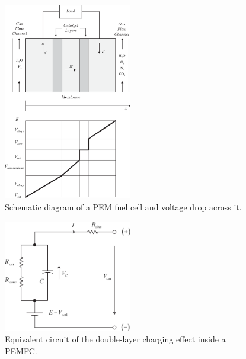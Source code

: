 \documentclass[11pt,a4paper]{article}
\numberwithin{equation}{section}
\theoremstyle{it}
\theoremstyle{definition}
\begin{document}
\begin{figure}[H]
	\centering
	\includegraphics[width = 0.5\textwidth, width = 250pt, angle = 0, keepaspectratio]{figures/pem_fuel_cell/pem_fuel_cell_1.eps}
	\captionsetup{width=0.5\textwidth}		
	\caption{Schematic diagram of a PEM fuel cell and voltage drop across it.}
	\label{pem_fc_intro_1}
\end{figure}

\begin{figure}[H]
	\centering
	\includegraphics[width = 0.5\textwidth, width = 250pt, angle = 0, keepaspectratio]{figures/pem_fuel_cell/pemfc_eq_circuit_1.eps}
	\captionsetup{width=0.5\textwidth}		
	\caption{Equivalent circuit of the double-layer charging effect inside a PEMFC.}
	\label{pem_fc_eq_circuit_intro_1}
\end{figure}
\end{document}

